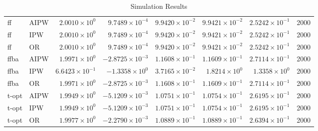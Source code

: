 \begin{table}[ht]
\begin{tabular}{llrrrrrr}
   \midrule
ff & AIPW & $2.0010 \times 10^{0}$ & $9.7489 \times 10^{-4}$ & $9.9420 \times 10^{-2}$ & $9.9421 \times 10^{-2}$ & $2.5242 \times 10^{-1}$ & 2000 \\ 
  ff & IPW & $2.0010 \times 10^{0}$ & $9.7489 \times 10^{-4}$ & $9.9420 \times 10^{-2}$ & $9.9421 \times 10^{-2}$ & $2.5242 \times 10^{-1}$ & 2000 \\ 
  ff & OR & $2.0010 \times 10^{0}$ & $9.7489 \times 10^{-4}$ & $9.9420 \times 10^{-2}$ & $9.9421 \times 10^{-2}$ & $2.5242 \times 10^{-1}$ & 2000 \\ 
   \midrule
ffba & AIPW & $1.9971 \times 10^{0}$ & $-2.8725 \times 10^{-3}$ & $1.1608 \times 10^{-1}$ & $1.1609 \times 10^{-1}$ & $2.7114 \times 10^{-1}$ & 2000 \\ 
  ffba & IPW & $6.6423 \times 10^{-1}$ & $-1.3358 \times 10^{0}$ & $3.7165 \times 10^{-2}$ & $1.8214 \times 10^{0}$ & $1.3358 \times 10^{0}$ & 2000 \\ 
  ffba & OR & $1.9971 \times 10^{0}$ & $-2.8725 \times 10^{-3}$ & $1.1608 \times 10^{-1}$ & $1.1609 \times 10^{-1}$ & $2.7114 \times 10^{-1}$ & 2000 \\ 
   \midrule
t-opt & AIPW & $1.9949 \times 10^{0}$ & $-5.1209 \times 10^{-3}$ & $1.0751 \times 10^{-1}$ & $1.0754 \times 10^{-1}$ & $2.6195 \times 10^{-1}$ & 2000 \\ 
  t-opt & IPW & $1.9949 \times 10^{0}$ & $-5.1209 \times 10^{-3}$ & $1.0751 \times 10^{-1}$ & $1.0754 \times 10^{-1}$ & $2.6195 \times 10^{-1}$ & 2000 \\ 
  t-opt & OR & $1.9977 \times 10^{0}$ & $-2.2790 \times 10^{-3}$ & $1.0889 \times 10^{-1}$ & $1.0889 \times 10^{-1}$ & $2.6394 \times 10^{-1}$ & 2000 \\ 
   \bottomrule
\end{tabular}
\caption{Simulation Results} 
\label{tab:results}
\end{table}
